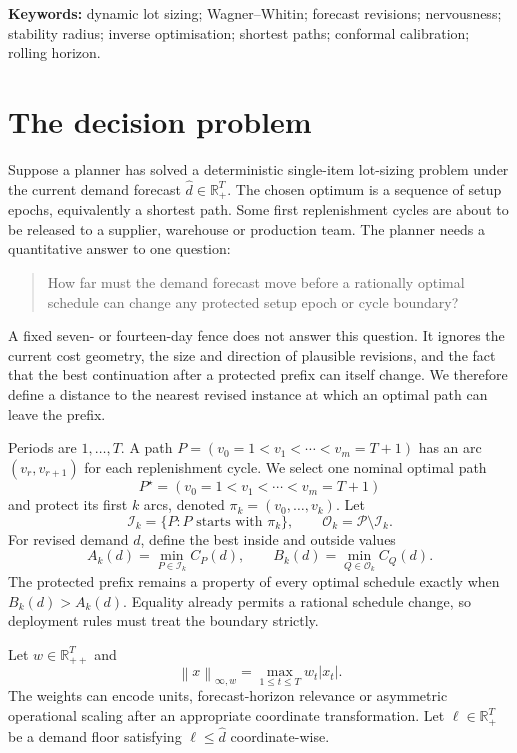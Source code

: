 \documentclass[11pt]{article}
\theoremstyle{definition}
\newcommand{\R}{\mathbb{R}}
\newcommand{\cI}{\mathcal{I}}
\newcommand{\cO}{\mathcal{O}}
\newcommand{\cP}{\mathcal{P}}
\newcommand{\norm}[1]{\left\lVert #1\right\rVert}
\newcommand{\dhat}{\widehat d}
\newcommand{\ellv}{\ell}
\begin{document}
\medskip
\noindent\textbf{Keywords:} dynamic lot sizing; Wagner--Whitin; forecast revisions; nervousness; stability radius; inverse optimisation; shortest paths; conformal calibration; rolling horizon.

\tableofcontents
\clearpage

\section{The decision problem}

Suppose a planner has solved a deterministic single-item lot-sizing problem under the current demand forecast $\dhat\in\R_+^T$. The chosen optimum is a sequence of setup epochs, equivalently a shortest path. Some first replenishment cycles are about to be released to a supplier, warehouse or production team. The planner needs a quantitative answer to one question:

\begin{quote}
How far must the demand forecast move before a rationally optimal schedule can change any protected setup epoch or cycle boundary?
\end{quote}

A fixed seven- or fourteen-day fence does not answer this question. It ignores the current cost geometry, the size and direction of plausible revisions, and the fact that the best continuation after a protected prefix can itself change. We therefore define a distance to the nearest revised instance at which an optimal path can leave the prefix.

Periods are $1,\ldots,T$. A path $P=(v_0=1<v_1<\cdots<v_m=T+1)$ has an arc $(v_r,v_{r+1})$ for each replenishment cycle. We select one nominal optimal path
\[
P^\star=(v_0=1<v_1<\cdots<v_m=T+1)
\]
and protect its first $k$ arcs, denoted $\pi_k=(v_0,\ldots,v_k)$. Let
\[
\cI_k=\{P:P\text{ starts with }\pi_k\},
\qquad
\cO_k=\cP\setminus\cI_k.
\]
For revised demand $d$, define the best inside and outside values
\[
A_k(d)=\min_{P\in\cI_k}C_P(d),
\qquad
B_k(d)=\min_{Q\in\cO_k}C_Q(d).
\]
The protected prefix remains a property of every optimal schedule exactly when $B_k(d)>A_k(d)$. Equality already permits a rational schedule change, so deployment rules must treat the boundary strictly.

Let $w\in\R_{++}^T$ and
\[
\norm{x}_{\infty,w}=\max_{1\le t\le T}w_t|x_t|.
\]
The weights can encode units, forecast-horizon relevance or asymmetric operational scaling after an appropriate coordinate transformation. Let $\ellv\in\R_+^T$ be a demand floor satisfying $\ellv\le\dhat$ coordinate-wise.
\end{document}
